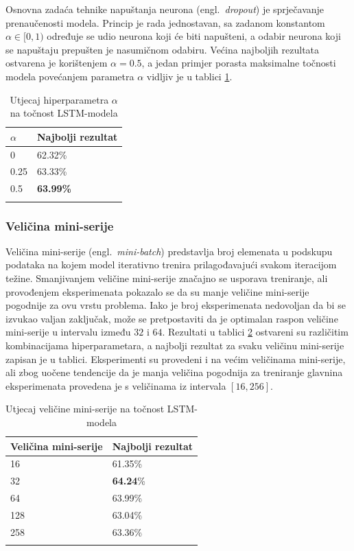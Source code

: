 \documentclass[times, utf8, zavrsni]{fer}
\begin{document}
Osnovna zadaća tehnike napuštanja neurona (engl.~\emph{dropout}) je sprječavanje prenaučenosti modela. Princip je rada jednostavan, sa zadanom konstantom $\alpha \in [0,1)$ određuje se udio neurona koji će biti napušteni, a odabir neurona koji se napuštaju prepušten je nasumičnom odabiru. Većina najboljih rezultata ostvarena je korištenjem $\alpha = 0.5$, a jedan primjer porasta maksimalne točnosti modela povećanjem parametra $\alpha$ vidljiv je u tablici \ref{dropout}.

\begin{table}[]
\centering
\begin{tabular}{|l|l|} 
\hline
$\alpha$ &Najbolji rezultat    \\ 
\hline
0 & 62.32\% \\ 
\hline
0.25  & 63.33\%  \\ 
\hline
0.5 & \textbf{63.99\%}   \\ 
\hline
\multicolumn{1}{l}{}  & \multicolumn{1}{l}{} 
\end{tabular}
\caption{Utjecaj hiperparametra $\alpha$ na točnost \gls{LSTM}-modela}
\label{dropout}
\end{table}


\subsubsection{Veličina mini-serije}

Veličina mini-serije (engl.~\emph{mini-batch}) predstavlja broj elemenata u podskupu podataka na kojem model iterativno trenira prilagođavajući svakom iteracijom težine. Smanjivanjem veličine mini-serije značajno se usporava treniranje, ali provođenjem eksperimenata pokazalo se da su manje veličine mini-serije pogodnije za ovu vrstu problema. Iako je broj eksperimenata nedovoljan da bi se izvukao valjan zaključak, može se pretpostaviti da je optimalan raspon veličine mini-serije u intervalu između $32$ i $64$. Rezultati u tablici \ref{minibatch} ostvareni su različitim kombinacijama hiperparametara, a najbolji rezultat za svaku veličinu mini-serije zapisan je u tablici. Eksperimenti su provedeni i na većim veličinama mini-serije, ali zbog uočene tendencije da je manja veličina pogodnija za treniranje glavnina eksperimenata provedena je s veličinama iz intervala $[16,256]$.

\begin{table}
\centering
\begin{tabular}{|l|l|} 
\hline
Veličina mini-serije &Najbolji rezultat    \\ 
\hline
16 & 61.35\% \\ 
\hline
32  & \textbf{64.24}\%  \\ 
\hline
64 & 63.99\%   \\ 
\hline
128 & 63.04\%   \\ 
\hline
258 & 63.36\%   \\ 
\hline
\multicolumn{1}{l}{}  & \multicolumn{1}{l}{} 
\end{tabular}
\caption{Utjecaj veličine mini-serije na točnost \gls{LSTM}-modela}
\label{minibatch}
\end{table}
\end{document}
